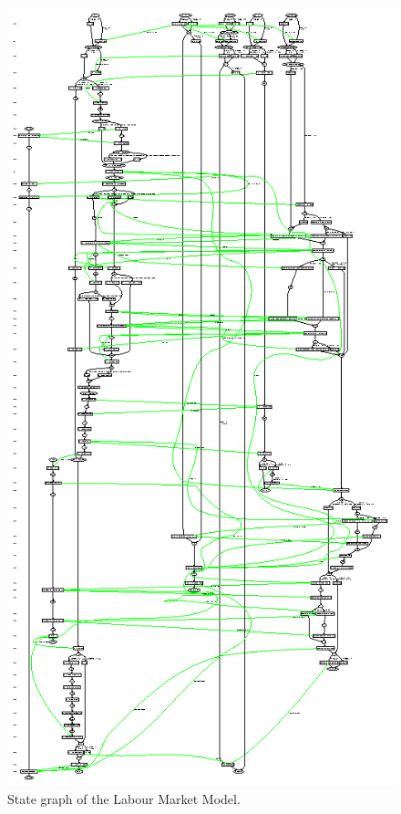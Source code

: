  \begin{figure}[!htb]
 \begin{center}
 \includegraphics*[scale=2.0]{stategraph-labour.ps}
 \caption{State graph of the Labour Market Model.} \label{fig:statelabour}
 \end{center}
 \end{figure}
